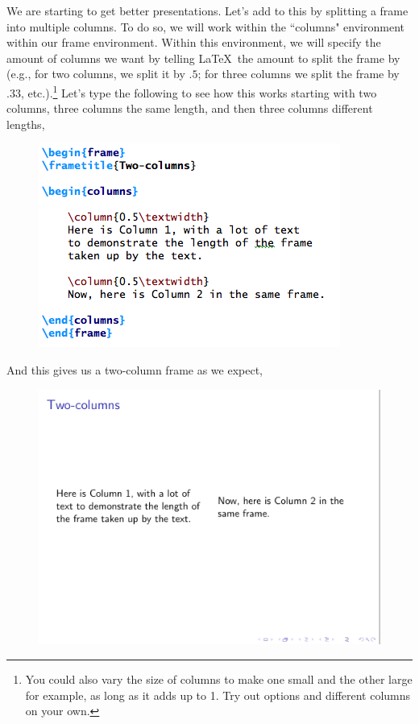\documentclass[11pt]{article}
\newcommand{\forceindent}{\leavevmode{\parindent=1.5em\indent}} %
\begin{document}
\forceindent We are starting to get better presentations. Let's add to this by splitting a frame into multiple columns. To do so, we will work within the ``columns" environment within our frame environment. Within this environment, we will specify the amount of columns we want by telling \LaTeX\ the amount to split the frame by (e.g., for two columns, we split it by $.5$; for three columns we split the frame by $.33$, etc.).\footnote{You could also vary the size of columns to make one small and the other large for example, as long as it adds up to 1. Try out options and different columns on your own.} Let's type the following to see how this works starting with two columns, three columns the same length, and then three columns different lengths,

\begin{figure}[!h]
	\includegraphics[scale=.6]{CODE6}
	\centering
\end{figure}

And this gives us a two-column frame as we expect, 

\begin{figure}[!h]
	\includegraphics[scale=.5]{OUT6}
	\centering
\end{figure}
\end{document}
